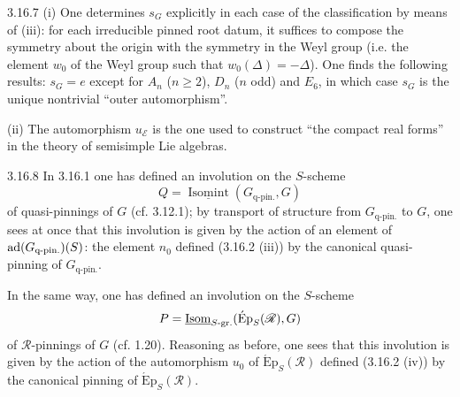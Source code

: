 \begin{remark}{3.16.7}\label{XXIV.3.16.7}
(i) One determines $s_G$ explicitly in each case of the classification by means of (iii): for each irreducible pinned root datum, it suffices to compose the symmetry about the origin with the symmetry in the Weyl group (i.e. the element $w_0$ of the Weyl group such that $w_0(\Delta)=-\Delta$). One finds the following results: $s_G=e$ except for $A_n$ ($n\geq2$), $D_n$ ($n$ odd) and $E_6$, in which case $s_G$ is the unique nontrivial ``outer automorphism''.

(ii) The automorphism $u_{\mathscr E}$ is the one used to construct ``the compact real forms'' in the theory of semisimple Lie algebras.
\end{remark}
\begin{remark}{3.16.8}\label{XXIV.3.16.8}
In 3.16.1 one has defined an involution on the $S$-scheme
\[
Q=\underline{\operatorname{Isomint}}(G_{\text{q-pin.}},G)
\]
of quasi-pinnings of $G$ (cf. 3.12.1); by transport of structure from $G_{\text{q-pin.}}$ to $G$, one sees at once that this involution is given by the action of an element of $\operatorname{ad}(G_{\text{q-pin.}})(S)$: the element $n_0$ defined (3.16.2 (iii)) by the canonical quasi-pinning of $G_{\text{q-pin.}}$.

In the same way, one has defined an involution on the $S$-scheme
\[
P=\underline{\operatorname{Isom}}_{S\text{-gr.}}(\operatorname{\acute Ep}_S(\mathscr R),G)
\]
of $\mathscr R$-pinnings of $G$ (cf. 1.20). Reasoning as before, one sees that this involution is given by the action of the automorphism $u_0$ of $\operatorname{\acute Ep}_S(\mathscr R)$ defined (3.16.2 (iv)) by the canonical pinning of $\operatorname{\acute Ep}_S(\mathscr R)$.
\end{remark}

